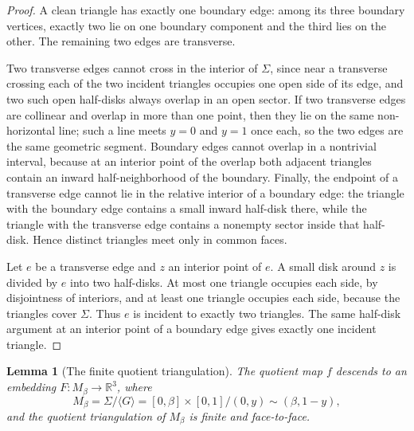 \documentclass[12pt]{article}
\newcommand{\R}{\mathbb R}
\theoremstyle{plain}
\newtheorem{lemma}[theorem]{Lemma}
\begin{document}
\begin{proof}
A clean triangle has exactly one boundary edge: among its three boundary
vertices, exactly two lie on one boundary component and the third lies on the
other.  The remaining two edges are transverse.

Two transverse edges cannot cross in the interior of \(\Sigma\), since near a
transverse crossing each of the two incident triangles occupies one open side
of its edge, and two such open half-disks always overlap in an open sector.  If
two transverse edges are collinear and overlap in more than one point, then
they lie on the same non-horizontal line; such a line meets \(y=0\) and
\(y=1\) once each, so the two edges are the same geometric segment.  Boundary
edges cannot overlap in a nontrivial interval, because at an interior point of
the overlap both adjacent triangles contain an inward half-neighborhood of the
boundary.  Finally, the endpoint of a transverse edge cannot lie in the
relative interior of a boundary edge: the triangle with the boundary edge
contains a small inward half-disk there, while the triangle with the transverse
edge contains a nonempty sector inside that half-disk.  Hence distinct
triangles meet only in common faces.

Let \(e\) be a transverse edge and \(z\) an interior point of \(e\).  A small
disk around \(z\) is divided by \(e\) into two half-disks.  At most one
triangle occupies each side, by disjointness of interiors, and at least one
triangle occupies each side, because the triangles cover \(\Sigma\).  Thus
\(e\) is incident to exactly two triangles.  The same half-disk argument at an
interior point of a boundary edge gives exactly one incident triangle.
\end{proof}

\begin{lemma}[The finite quotient triangulation]\label{lem:quotient}
The quotient map \(f\) descends to an embedding
\(F:M_\beta\to\R^3\), where
\[
M_\beta=\Sigma/\langle G\rangle
      =[0,\beta]\times[0,1]/(0,y)\sim(\beta,1-y),
\]
and the quotient triangulation of \(M_\beta\) is finite and face-to-face.
\end{lemma}
\end{document}
